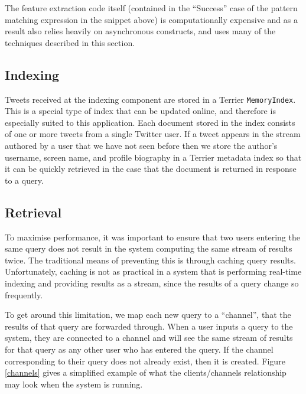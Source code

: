 \documentclass{l4proj}
\newcommand{\code}[1]{\texttt{#1}}
\begin{document}
The feature extraction code itself (contained in the ``Success'' case of the pattern matching expression in the snippet above) is computationally expensive and as a result also relies heavily on asynchronous constructs, and uses many of the techniques described in this section.

        \subsection{Indexing}
        Tweets received at the indexing component are stored in a Terrier \code{MemoryIndex}. This is a special type of index that can be updated  online, and therefore is especially suited to this application. Each document stored in the index consists of one or more tweets from a single Twitter user. If a tweet appears in the stream authored by a user that we have not seen before then we store the author's username, screen name, and profile biography in a Terrier metadata index so that it can be quickly retrieved in the case that the document is returned in response to a query.        
        
        \subsection{Retrieval}
        
        To maximise performance, it was important to ensure that two users entering the same query does not result in the system computing the same stream of results twice. The traditional means of preventing this is through caching query results. Unfortunately, caching is not as practical in a system that is performing real-time indexing and providing results as a stream, since the results of a query change so frequently.
        
        To get around this limitation, we map each new query to a ``channel'', that the results of that query are forwarded through. When a user inputs a query to the system, they are connected to a channel and will see the same stream of results for that query as any other user who has entered the query. If the channel corresponding to their query does not already exist, then it is created. Figure \ref{channels} gives a simplified example of what the clients/channels relationship may look when the system is running.
        
\end{document}
